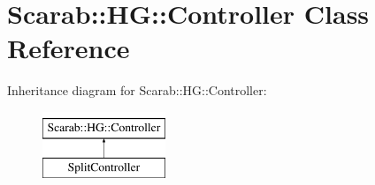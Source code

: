 \hypertarget{classScarab_1_1HG_1_1Controller}{
\section{Scarab::HG::Controller Class Reference}
\label{classScarab_1_1HG_1_1Controller}
}
Inheritance diagram for Scarab::HG::Controller:\begin{figure}[H]
\begin{center}
\leavevmode
\includegraphics[height=2cm]{classScarab_1_1HG_1_1Controller}
\end{center}
\end{figure}
